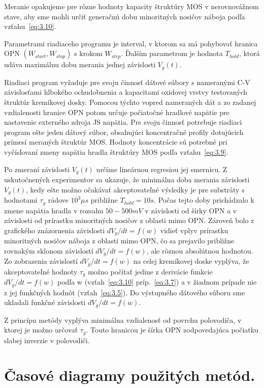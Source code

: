 Meranie opakujeme pre rôzne hodnoty kapacity štruktúry MOS v
nerovnovážnom stave, aby sme mohli určiť generačnú dobu minoritných
nosičov náboja podľa vzťahu~\ref{eq:3.10}.

Parametrami riadiaceho programu je interval, v ktorom sa má pohybovať
hranica OPN $(W_{start}, W_{stop})$ s krokom $W_{step}$. Ďalším
parametrom je hodnota $T_{hold}$, ktorá udáva maximálnu dobu merania
jednej závislosti $V_{g}(t)$.

Riadiaci program vyžaduje pre svoju činnosť dátové súbory s nameranými
C-V závislosťami hlbokého ochudobnenia a kapacitami oxidovej vrstvy
testovaných štruktúr kremíkovej dosky. Pomocou týchto vopred
nameraných dát a zo zadanej vzdialenosti hranice OPN potom určuje
počiatočné hradlové napätie pre nastavenie externého zdroja JS
napätia.  Pre svoju činnosť potrebuje riadiaci program ešte jeden
dátový súbor, obsahujúci koncentračné profily dotujúcich prímesí
meraných štruktúr MOS\@. Hodnoty koncentrácie sú potrebné pri
vyčísľovaní zmeny napätia hradla štruktúry MOS podľa
vzťahu~\ref{eq:3.9}.

Po zmeraní závislosti $V_{g}(t)$ určíme lineárnou regresiou jej
smernicu. Z uskutočnených experimentov sa ukazuje, že minimálna doba
merania závislosti $V_{g}(t)$, kedy ešte možno očakávať akceptovateľné
výsledky je pre substráty s hodnotami $\tau_g$ rádove $10^{3}\mu{s}$
približne $T_{hold}=10s$. Počas tejto doby prichádzalo k zmene napätia
hradla v rozsahu $50-500 mV$ v závislosti od šírky OPN a v závislosti
od prírastku minoritných nosičov z oblasti mimo OPN\@. Zároveň bolo z
grafického znázornenia závislosti ${dV_g}/{dt}=f(w)$ vidieť vplyv
prírastku minoritných nosičov náboja z oblasti mimo OPN, čo sa
prejavilo približne rovnakým sklonom závislostí
${dV_g}/{dt}=f(w)$, ale rôznou absolútnou hodnotou. Zo zobrazenia
závislostí ${dV_g}/{dt}=f(w)$ na celej kremíkovej doske vyplýva,
že akceptovateľné hodnoty $\tau_{g}$ možno počítať jedine z derivácie
funkcie ${dV_g}/{dt}=f(w)$ podľa w (vzťah~\ref{eq:3.10}
príp.~\ref{eq:3.7}) a v žiadnom prípade nie z jej funkčných hodnôt
(vzťah~\ref{eq:3.5}). Do výstupného dátového súboru sme ukladali
funkčné závislosti ${dV_g}/{dt}=f(w)$.

Z princípu metódy vyplýva minimálna vzdialenosť od povrchu polovodiča,
v ktorej je možno určovať $\tau_{g}$. Touto hranicou je šírka OPN
zodpovedajúca počiatku slabej inverzie v polovodiči.

\section{Časové diagramy použitých metód.}\label{sec:5.4}

